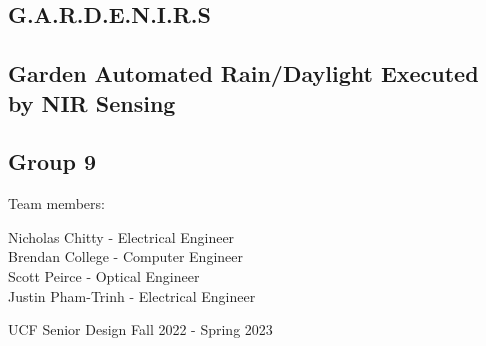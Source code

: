 \begin{titlepage}
    \begin{center}
        \section*{G.A.R.D.E.N.I.R.S}
        \subsection*{Garden Automated Rain/Daylight Executed by NIR Sensing}
        \subsection*{Group 9}
        \begin{Large}
            Team members:\\
            \vspace{.5cm}
        \end{Large}
        \begin{large}
            Nicholas Chitty - Electrical Engineer\\
            Brendan College - Computer Engineer\\
            Scott Peirce - Optical Engineer\\
            Justin Pham-Trinh - Electrical Engineer \\
        \end{large}
        \vfill
        UCF Senior Design Fall 2022 - Spring 2023

        \pagebreak
    \end{center}
\end{titlepage}